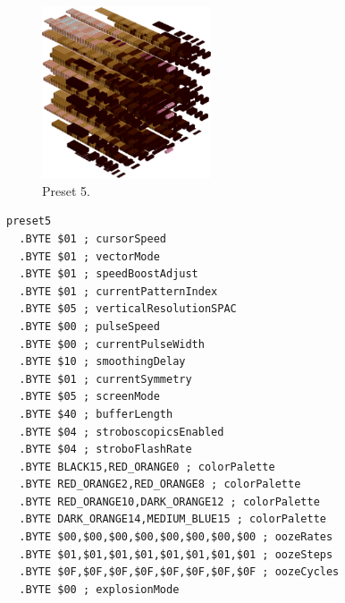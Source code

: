 \vspace*{-0.5cm}
\begin{minipage}[b]{0.48\linewidth}
\begin{figure}[H]                                                          
  \centering                                                             
  \begin{adjustbox}{width=5cm,center}                                   
  \includegraphics[width=5cm]{src/colorspace_presets/preset5-45.png}%
  \end{adjustbox}                                                        
\caption*{Preset 5.}                                           
\end{figure}                                                               
\end{minipage}
\hspace{0.1cm}
\begin{minipage}[b]{0.48\linewidth}                                                                         
\begin{lstlisting}[basicstyle=\ttfamily\tiny]
preset5
  .BYTE $01 ; cursorSpeed
  .BYTE $01 ; vectorMode
  .BYTE $01 ; speedBoostAdjust
  .BYTE $01 ; currentPatternIndex
  .BYTE $05 ; verticalResolutionSPAC
  .BYTE $00 ; pulseSpeed
  .BYTE $00 ; currentPulseWidth
  .BYTE $10 ; smoothingDelay
  .BYTE $01 ; currentSymmetry
  .BYTE $05 ; screenMode
  .BYTE $40 ; bufferLength
  .BYTE $04 ; stroboscopicsEnabled
  .BYTE $04 ; stroboFlashRate
  .BYTE BLACK15,RED_ORANGE0 ; colorPalette
  .BYTE RED_ORANGE2,RED_ORANGE8 ; colorPalette
  .BYTE RED_ORANGE10,DARK_ORANGE12 ; colorPalette
  .BYTE DARK_ORANGE14,MEDIUM_BLUE15 ; colorPalette
  .BYTE $00,$00,$00,$00,$00,$00,$00,$00 ; oozeRates
  .BYTE $01,$01,$01,$01,$01,$01,$01,$01 ; oozeSteps
  .BYTE $0F,$0F,$0F,$0F,$0F,$0F,$0F,$0F ; oozeCycles
  .BYTE $00 ; explosionMode
\end{lstlisting}
\end{minipage}


